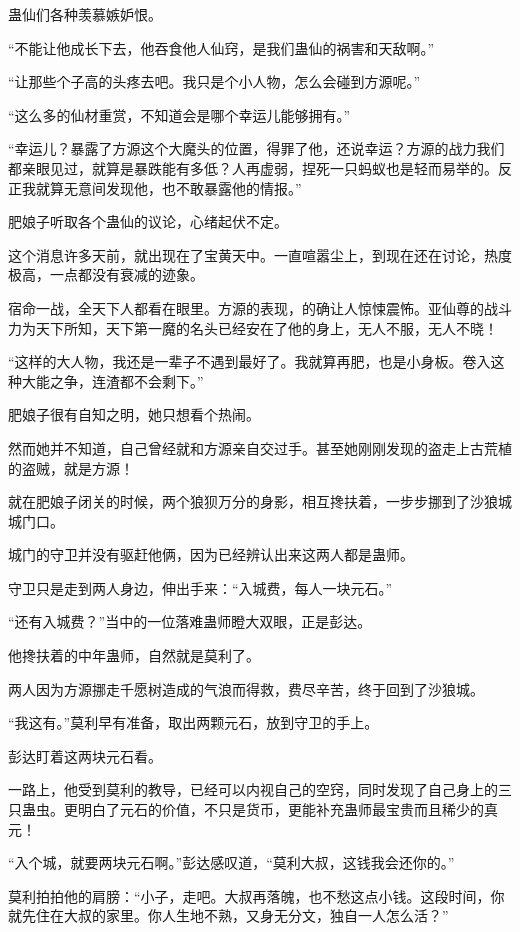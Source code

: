 \begin{this_body}
蛊仙们各种羡慕嫉妒恨。

“不能让他成长下去，他吞食他人仙窍，是我们蛊仙的祸害和天敌啊。”

“让那些个子高的头疼去吧。我只是个小人物，怎么会碰到方源呢。”

“这么多的仙材重赏，不知道会是哪个幸运儿能够拥有。”

“幸运儿？暴露了方源这个大魔头的位置，得罪了他，还说幸运？方源的战力我们都亲眼见过，就算是暴跌能有多低？人再虚弱，捏死一只蚂蚁也是轻而易举的。反正我就算无意间发现他，也不敢暴露他的情报。”

肥娘子听取各个蛊仙的议论，心绪起伏不定。

这个消息许多天前，就出现在了宝黄天中。一直喧嚣尘上，到现在还在讨论，热度极高，一点都没有衰减的迹象。

宿命一战，全天下人都看在眼里。方源的表现，的确让人惊悚震怖。亚仙尊的战斗力为天下所知，天下第一魔的名头已经安在了他的身上，无人不服，无人不晓！

“这样的大人物，我还是一辈子不遇到最好了。我就算再肥，也是小身板。卷入这种大能之争，连渣都不会剩下。”

肥娘子很有自知之明，她只想看个热闹。

然而她并不知道，自己曾经就和方源亲自交过手。甚至她刚刚发现的盗走上古荒植的盗贼，就是方源！

就在肥娘子闭关的时候，两个狼狈万分的身影，相互搀扶着，一步步挪到了沙狼城城门口。

城门的守卫并没有驱赶他俩，因为已经辨认出来这两人都是蛊师。

守卫只是走到两人身边，伸出手来：“入城费，每人一块元石。”

“还有入城费？”当中的一位落难蛊师瞪大双眼，正是彭达。

他搀扶着的中年蛊师，自然就是莫利了。

两人因为方源挪走千愿树造成的气浪而得救，费尽辛苦，终于回到了沙狼城。

“我这有。”莫利早有准备，取出两颗元石，放到守卫的手上。

彭达盯着这两块元石看。

一路上，他受到莫利的教导，已经可以内视自己的空窍，同时发现了自己身上的三只蛊虫。更明白了元石的价值，不只是货币，更能补充蛊师最宝贵而且稀少的真元！

“入个城，就要两块元石啊。”彭达感叹道，“莫利大叔，这钱我会还你的。”

莫利拍拍他的肩膀：“小子，走吧。大叔再落魄，也不愁这点小钱。这段时间，你就先住在大叔的家里。你人生地不熟，又身无分文，独自一人怎么活？”


\end{this_body}
